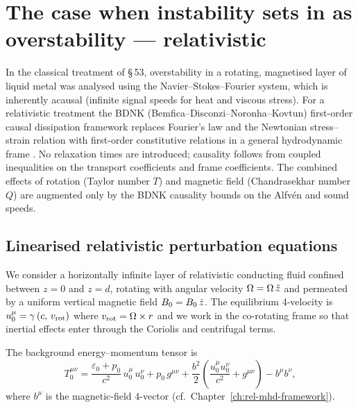 
\section{The case when instability sets in as overstability --- relativistic}\label{sec:rel-53}

In the classical treatment of \S\,53, overstability in a rotating, magnetised
layer of liquid metal was analysed using the Navier--Stokes--Fourier system,
which is inherently acausal (infinite signal speeds for heat and viscous
stress).  For a relativistic treatment the BDNK
(Bemfica--Disconzi--Noronha--Kovtun) first-order causal dissipation
framework replaces Fourier's law and the Newtonian stress--strain relation
with first-order constitutive relations in a general hydrodynamic frame
\citep{BemficaDN2018,Kovtun2019}.  No relaxation times are introduced;
causality follows from coupled inequalities on the transport coefficients
and frame coefficients.  The combined effects of rotation (Taylor number $T$)
and magnetic field (Chandrasekhar number $Q$) are augmented only by the
BDNK causality bounds on the Alfv\'en and sound speeds.

\subsection{Linearised relativistic perturbation equations}

We consider a horizontally infinite layer of relativistic conducting fluid
confined between $z=0$ and $z=d$, rotating with angular velocity
$\Omega=\Omega\,\hat{z}$ and permeated by a uniform vertical
magnetic field $B_0 = B_0\,\hat{z}$.  The equilibrium
4-velocity is $u^{\mu}_0 = \gamma\,(c,\,v_{\mathrm{rot}})$ where
$v_{\mathrm{rot}} = \Omega\times r$ and we work in the
co-rotating frame so that inertial effects enter through the Coriolis and
centrifugal terms.

The background energy--momentum tensor is
\begin{equation}
  T^{\mu\nu}_0 = \frac{\varepsilon_0+p_0}{c^{2}}\,u^{\mu}_0\,u^{\nu}_0
  + p_0\,g^{\mu\nu}
  + \frac{b^{2}}{2}\!\left(\frac{u^{\mu}_0 u^{\nu}_0}{c^{2}}
  + g^{\mu\nu}\right) - b^{\mu}b^{\nu},
  \label{eq:rel53-T0}
\end{equation}
where $b^{\mu}$ is the magnetic-field 4-vector (cf.\ Chapter~\ref{ch:rel-mhd-framework}).

